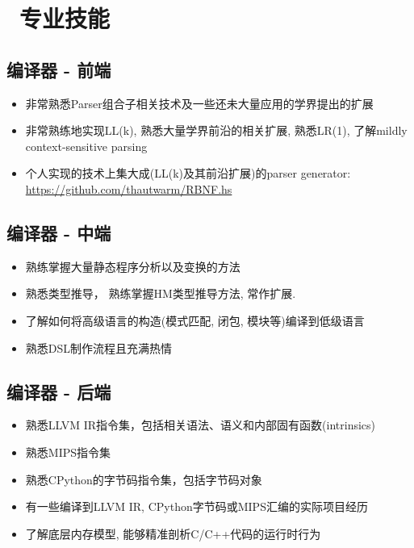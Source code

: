 \documentclass{resume}
\begin{document}



\section{\faCogs\ 专业技能}

\subsection{\textbf{编译器 - 前端}}
\begin{itemize}
    \item 非常熟悉Parser组合子相关技术及一些还未大量应用的学界提出的扩展
    \item 非常熟练地实现LL(k), 熟悉大量学界前沿的相关扩展, 熟悉LR(1), 了解mildly context-sensitive parsing
    \item 个人实现的技术上集大成(LL(k)及其前沿扩展)的parser generator: \url{https://github.com/thautwarm/RBNF.hs}
\end{itemize}


\subsection{\textbf{编译器 - 中端}}
\begin{itemize}
  \item 熟练掌握大量静态程序分析以及变换的方法
  \item 熟悉类型推导， 熟练掌握HM类型推导方法, 常作扩展.
  \item 了解如何将高级语言的构造(模式匹配, 闭包, 模块等)编译到低级语言
  \item 熟悉DSL制作流程且充满热情
\end{itemize}

\subsection{\textbf{编译器 - 后端}}
\begin{itemize}
  \item 熟悉LLVM IR指令集，包括相关语法、语义和内部固有函数(intrinsics)
  \item 熟悉MIPS指令集
  \item 熟悉CPython的字节码指令集，包括字节码对象
  \item 有一些编译到LLVM IR, CPython字节码或MIPS汇编的实际项目经历
  \item 了解底层内存模型, 能够精准剖析C/C++代码的运行时行为
\end{itemize}
\end{document}
